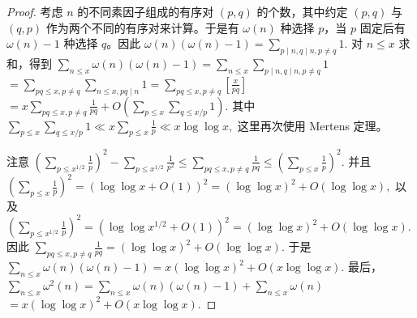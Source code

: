 \begin{proof}
	考虑 $n$ 的不同素因子组成的有序对 $(p,q)$ 的个数，其中约定 $(p,q)$ 与 $(q,p)$ 作为两个不同的有序对来计算。于是有 $\omega(n)$ 种选择 $p$，当 $p$ 固定后有 $\omega(n)-1$ 种选择 $q$。因此
	\(\textstyle \omega(n)(\omega(n)-1) =\allowbreak{} \sum_{p\mid\allowbreak{} n,\allowbreak{} q\mid\allowbreak{} n,\allowbreak{} p\neq\allowbreak{} q}1.\)
	对 $n\leq x$ 求和，得到
	\(\textstyle \sum_{n\leq\allowbreak{} x}\omega(n)(\omega(n)-1) =\allowbreak{} \sum_{n\leq\allowbreak{} x} \sum_{p\mid\allowbreak{} n,\allowbreak{} q\mid\allowbreak{} n,\allowbreak{} p\neq\allowbreak{} q}1\) \(\textstyle =\allowbreak{} \sum_{pq\leq\allowbreak{} x,\allowbreak{} p\neq\allowbreak{} q} \sum_{n\leq\allowbreak{} x,\allowbreak{} pq\mid\allowbreak{} n}1 =\allowbreak{} \sum_{pq\leq\allowbreak{} x,\allowbreak{} p\neq\allowbreak{} q} \left[\frac{x}{pq}\right]\) \(\textstyle =\allowbreak{} x\sum_{pq\leq\allowbreak{} x,\allowbreak{} p\neq\allowbreak{} q}\frac1{pq} +\allowbreak{} O\left( \sum_{p\leq\allowbreak{} x}\sum_{q\leq\allowbreak{} x/p}1 \right).\)
	其中
	\(\textstyle \sum_{p\leq\allowbreak{} x}\sum_{q\leq\allowbreak{} x/p}1 \ll\allowbreak{} x\sum_{p\leq\allowbreak{} x}\frac1p \ll\allowbreak{} x\log\log x,\allowbreak{}\)
	这里再次使用 Mertens 定理。

	注意
	\(\textstyle \left(\sum_{p\leq\allowbreak{} x^{1/2}}\frac1p\right)^2 - \sum_{p\leq\allowbreak{} x^{1/2}}\frac1{p^2} \leq\allowbreak{} \sum_{pq\leq\allowbreak{} x,\allowbreak{} p\neq\allowbreak{} q}\frac1{pq} \leq\allowbreak{} \left(\sum_{p\leq\allowbreak{} x}\frac1p\right)^2.\)
	并且
	\(\textstyle \left(\sum_{p\leq\allowbreak{} x}\frac1p\right)^2 =\allowbreak{} (\log\log x+\allowbreak{}O(1))^2 =\allowbreak{} (\log\log x)^2+\allowbreak{}O(\log\log x),\allowbreak{}\)
	以及
	\(\textstyle \left(\sum_{p\leq\allowbreak{} x^{1/2}}\frac1p\right)^2 =\allowbreak{} (\log\log x^{1/2}+\allowbreak{}O(1))^2 =\allowbreak{} (\log\log x)^2+\allowbreak{}O(\log\log x).\)
	因此
	\(\textstyle \sum_{pq\leq\allowbreak{} x,\allowbreak{} p\neq\allowbreak{} q}\frac1{pq} =\allowbreak{} (\log\log x)^2+\allowbreak{}O(\log\log x).\)
	于是
	\(\textstyle \sum_{n\leq\allowbreak{} x}\omega(n)(\omega(n)-1) =\allowbreak{} x(\log\log x)^2+\allowbreak{}O(x\log\log x).\)
	最后，
	\(\textstyle \sum_{n\leq\allowbreak{} x}\omega^2(n) =\allowbreak{} \sum_{n\leq\allowbreak{} x}\omega(n)(\omega(n)-1) +\allowbreak{} \sum_{n\leq\allowbreak{} x}\omega(n)\) \(\textstyle =\allowbreak{} x(\log\log x)^2+\allowbreak{}O(x\log\log x).\)
\end{proof}

